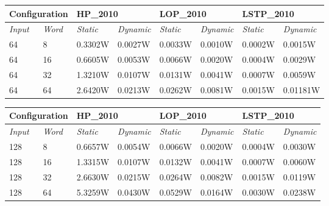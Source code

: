 \begin{table}[b!]
\centering
\label{my-label}
\begin{tabular}{@{}llllllll@{}}
\toprule
\multicolumn{2}{l}{\textbf{Configuration}} & \multicolumn{2}{l}{\textbf{HP\_2010}} & \multicolumn{2}{l}{\textbf{LOP\_2010}} & \multicolumn{2}{l}{\textbf{LSTP\_2010}} \\ \midrule
\textit{Input}         & \textit{Word}        & \textit{Static}   & \textit{Dynamic}  & \textit{Static}   & \textit{Dynamic}   & \textit{Static}    & \textit{Dynamic}   \\
64                     & 8                 & 0.3302W            & 0.0027W            & 0.0033W            & 0.0010W             & 0.0002W             & 0.0015W             \\
64                     & 16                & 0.6605W            & 0.0053W            & 0.0066W            & 0.0020W             & 0.0004W             & 0.0029W             \\
64                     & 32                & 1.3210W            & 0.0107W            & 0.0131W            & 0.0041W             & 0.0007W             & 0.0059W             \\
64                     & 64                & 2.6420W            & 0.0213W            & 0.0262W            & 0.0081W             & 0.0015W             & 0.01181W           
\end{tabular}
\end{table}

\begin{table}[b!]
\centering
\label{my-label}
\begin{tabular}{@{}llllllll@{}}
\toprule
\multicolumn{2}{l}{\textbf{Configuration}} & \multicolumn{2}{l}{\textbf{HP\_2010}} & \multicolumn{2}{l}{\textbf{LOP\_2010}} & \multicolumn{2}{l}{\textbf{LSTP\_2010}} \\ \midrule
\textit{Input}         & \textit{Word}        & \textit{Static}   & \textit{Dynamic}  & \textit{Static}   & \textit{Dynamic}   & \textit{Static}    & \textit{Dynamic}   \\
128                    & 8                 & 0.6657W            & 0.0054W            & 0.0066W            & 0.0020W             & 0.0004W             & 0.0030W             \\
128                    & 16                & 1.3315W            & 0.0107W            & 0.0132W            & 0.0041W             & 0.0007W             & 0.0060W             \\
128                    & 32                & 2.6630W            & 0.0215W            & 0.0264W            & 0.0082W             & 0.0015W             & 0.0119W             \\
128                    & 64                & 5.3259W            & 0.0430W            & 0.0529W            & 0.0164W             & 0.0030W             & 0.0238W            
\end{tabular}
\end{table}

